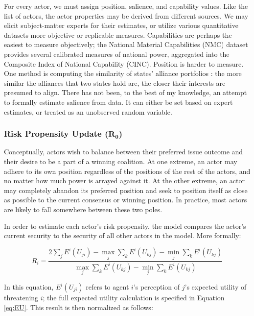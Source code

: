 For every actor, we must assign position, salience, and capability values. Like the list of actors, the actor properties may be derived from different sources. We may elicit subject-matter experts for their estimates, or utilize various quantitative datasets more objective or replicable measures. Capabilities are perhaps the easiest to measure objectively; the National Material Capabilities (NMC) dataset \citep{singer_1972,singer_1988} provides several calibrated measures of national power, aggregated into the Composite Index of National Capability (CINC). Position is harder to measure. One method is computing the similarity of states' alliance portfolios \citep{bdm_1975,bdm_1992,signorino_1999b}: the more similar the alliances that two states hold are, the closer their interests are presumed to align. There has not been, to the best of my knowledge, an attempt to formally estimate salience from data. It can either be set based on expert estimates, or treated as an unobserved random variable.


\subsubsection{Risk Propensity Update ($\mathbf{R_0}$)} \label{risk_update}

Conceptually, actors wish to balance between their preferred issue outcome and their desire to be a part of a winning coalition. At one extreme, an actor may adhere to its own position regardless of the positions of the rest of the actors, and no matter how much power is arrayed against it. At the other extreme, an actor may completely abandon its preferred position and seek to position itself as close as possible to the current consensus or winning position. In practice, most actors are likely to fall somewhere between these two poles.

In order to estimate each actor's risk propensity, the model compares the actor's current security to the security of all other actors in the model. More formally:

\begin{equation}
    R_i = \frac{ 2 \sum\limits_j E^i(U_{ji}) - \max\limits_j \sum\limits_{k} E^i(U_{kj})  -  \min\limits_j \sum\limits_{k} E^i(U_{kj})}{\max\limits_j \sum\limits_{k} E^i(U_{kj})  -  \min\limits_j \sum\limits_{k} E^i(U_{kj})} \label{eq:R_0}
\end{equation}

In this equation, $E^i(U_{ji})$ refers to agent $i$'s perception of $j$'s expected utility of threatening $i$; the full expected utility calculation is specified in Equation \ref{eq:EU}. This result is then normalized as follows:


